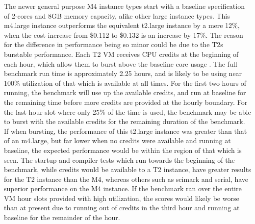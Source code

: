 \documentclass{entcs} \usepackage{entcsmacro}
\begin{document}
The newer general purpose M4 instance types start with a baseline specification of 2-cores and 8GB memory capacity, alike other large instance types. This m4.large instance outperforms the equivalent t2.large instance by a mere 12\%, when the cost increase from \$0.112 to \$0.132 is an increase by 17\%. The reason for the difference in performance being so minor could be due to the T2s burstable performance. Each T2 VM receives CPU credits at the beginning of each hour, which allow them to burst above the baseline core usage \cite{awsvmtype}. The full benchmark run time is approximately 2.25 hours, and is likely to be using near 100\% utilization of that which is available at all times. For the first two hours of running, the benchmark will use up the available credits, and run at baseline for the remaining time before more credits are provided at the hourly boundary. For the last hour slot where only 25\% of the time is used, the benchmark may be able to burst with the available credits for the remaining duration of the benchmark. If when bursting, the performance of this t2.large instance was greater than that of an m4.large, but far lower when no credits were available and running at baseline, the expected performance would be within the region of that which is seen. The startup and compiler tests which run towards the beginning of the benchmark, while credits would be available to a T2 instance, have greater results for the T2 instance than the M4, whereas others such as scimark and serial, have superior performance on the M4 instance. If the benchmark ran over the entire VM hour slots provided with high utilization, the scores would likely be worse than at present due to running out of credits in the third hour and running at baseline for the remainder of the hour.


\end{document}
